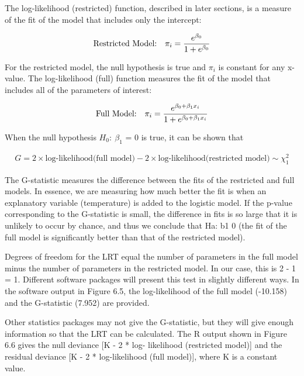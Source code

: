 \documentclass[
]{report}
\begin{document}
The log-likelihood (restricted) function, described in later sections, is a measure of the fit of the model that includes only the intercept:

\begin{align}
\text{Restricted Model:} \quad \pi_i = \frac{e^{\beta_0}}{1 + e^{\beta_0}}
\notag
\end{align}

For the restricted model, the null hypothesis is true and \(\scriptstyle \pi_i\) is constant for any x-value. The log-likelihood (full) function measures the fit of the model that includes all of the parameters of interest:

\begin{align}
\text{Full Model:} \quad \pi_i = \frac{e^{\beta_0 + \beta_1 x_i}}{1 + e^{\beta_0 + \beta_1 x_i}}
\notag
\end{align}

When the null hypothesis \(\scriptstyle H_0:\  \beta_1\) = 0 is true, it can be shown that

\begin{align}
G = 2 \times \text{log-likelihood(full model)} - 2 \times \text{log-likelihood(restricted model)} \sim \chi^2_1 
\tag{6.15}
\end{align}

The G-statistic measures the difference between the fits of the restricted and full models. In essence, we are measuring how much better the fit is when an explanatory variable (temperature) is added to the logistic model. If the p-value corresponding to the G-statistic is small, the difference in fits is so large that it is unlikely to occur by chance, and thus we conclude that Ha: b1 0 (the fit of the full model is significantly better than that of the restricted model).

Degrees of freedom for the LRT equal the number of parameters in the full model minus the number of
parameters in the restricted model. In our case, this is 2 - 1 = 1. Different software packages will present this test in slightly different ways. In the software output in Figure 6.5, the log-likelihood of the full model (-10.158) and the G-statistic (7.952) are provided.

Other statistics packages may not give the G-statistic, but they will give enough information so that
the LRT can be calculated. The R output shown in Figure 6.6 gives the null deviance {[}K - 2 * log-
likelihood (restricted model){]} and the residual deviance {[}K - 2 * log-likelihood (full model){]}, where
K is a constant value.
\end{document}
